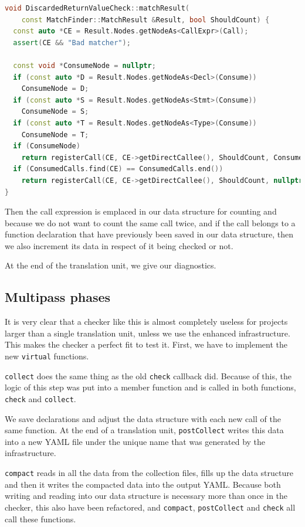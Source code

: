 \begin{lstlisting}[language={C++},caption={Catching nodes of used return values.},label={lst:consume}]
void DiscardedReturnValueCheck::matchResult(
	const MatchFinder::MatchResult &Result, bool ShouldCount) {
  const auto *CE = Result.Nodes.getNodeAs<CallExpr>(Call);
  assert(CE && "Bad matcher");

  const void *ConsumeNode = nullptr;
  if (const auto *D = Result.Nodes.getNodeAs<Decl>(Consume))
    ConsumeNode = D;
  if (const auto *S = Result.Nodes.getNodeAs<Stmt>(Consume))
    ConsumeNode = S;
  if (const auto *T = Result.Nodes.getNodeAs<Type>(Consume))
    ConsumeNode = T;
  if (ConsumeNode)
    return registerCall(CE, CE->getDirectCallee(), ShouldCount, ConsumeNode);
  if (ConsumedCalls.find(CE) == ConsumedCalls.end())
	return registerCall(CE, CE->getDirectCallee(), ShouldCount, nullptr);
}
\end{lstlisting}

Then the call expression is emplaced in our data structure for counting and because we do not want to count the same call twice, and if
the call belongs to a function declaration that have previously been saved in our data structure, then we also increment its data in
respect of it being checked or not.

At the end of the translation unit, we give our diagnostics.

\subsection{Multipass phases}

It is very clear that a checker like this is almost completely useless for projects larger than a single translation unit, unless we use
the enhanced infrastructure. This makes the checker a perfect fit to test it. First, we have to implement the new \lstinline{virtual} functions.

\texttt{collect} does the same thing as the old \texttt{check} callback did. Because of this, the logic of this step was put
into a member function and is called in both functions, \texttt{check} and \texttt{collect}.

We save declarations and adjust the data structure with each new call of the same function. At the end of a translation unit, \texttt{postCollect}
writes this data into a new YAML file under the unique name that was generated by the infrastructure.

\texttt{compact} reads in all the data from the collection files, fills up the data structure and then it writes the compacted data into the output YAML.
Because both writing and reading into our data structure is necessary more than once in the checker, this also have been refactored, and \texttt{compact},
\texttt{postCollect} and \texttt{check} all call these functions.

